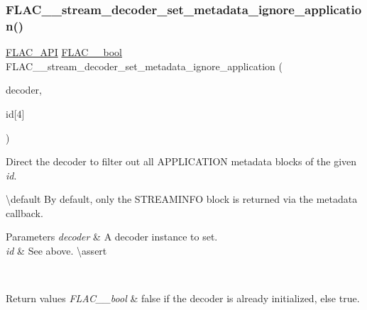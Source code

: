 \subsubsection{\texorpdfstring{FLAC\_\_stream\_decoder\_set\_metadata\_ignore\_application()}{FLAC\_\_stream\_decoder\_set\_metadata\_ignore\_application()}}
{\footnotesize\ttfamily \mbox{\hyperlink{group__flac__export_ga56ca07df8a23310707732b1c0007d6f5}{F\+L\+A\+C\+\_\+\+A\+PI}} \mbox{\hyperlink{ordinals_8h_a95103469f1cbd78b8cf250194985b34e}{F\+L\+A\+C\+\_\+\+\_\+bool}} F\+L\+A\+C\+\_\+\+\_\+stream\+\_\+decoder\+\_\+set\+\_\+metadata\+\_\+ignore\+\_\+application (\begin{DoxyParamCaption}\item[{\mbox{\hyperlink{struct_f_l_a_c_____stream_decoder}{F\+L\+A\+C\+\_\+\+\_\+\+Stream\+Decoder}} $\ast$}]{decoder,  }\item[{const \mbox{\hyperlink{ordinals_8h_a5eb569b12d5b047cdacada4d57924ee3}{F\+L\+A\+C\+\_\+\+\_\+byte}}}]{id\mbox{[}4\mbox{]} }\end{DoxyParamCaption})}

Direct the decoder to filter out all A\+P\+P\+L\+I\+C\+A\+T\+I\+ON metadata blocks of the given {\itshape id}.

\textbackslash{}default By default, only the {\ttfamily S\+T\+R\+E\+A\+M\+I\+N\+FO} block is returned via the metadata callback. 
\begin{DoxyParams}{Parameters}
{\em decoder} & A decoder instance to set. \\
\hline
{\em id} & See above. \textbackslash{}assert 
\begin{DoxyCode}{1}
\end{DoxyCode}
 
\begin{DoxyCode}{1}
\end{DoxyCode}
 \\
\hline
\end{DoxyParams}

\begin{DoxyRetVals}{Return values}
{\em F\+L\+A\+C\+\_\+\+\_\+bool} & {\ttfamily false} if the decoder is already initialized, else {\ttfamily true}. \\
\hline
\end{DoxyRetVals}
\mbox{\label{group__flac__stream__decoder_ga1644555cae7c54215c39bb4971100728}} 
